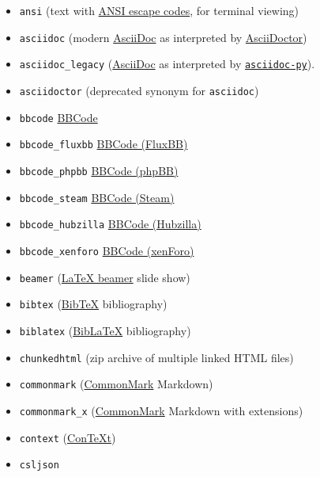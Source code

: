 \documentclass[
]{article}
\providecommand{\tightlist}{%
  \setlength{\itemsep}{0pt}\setlength{\parskip}{0pt}}
\begin{document}
\begin{description}
\hypertarget{output-formats}{}
\begin{itemize}
\tightlist
\item
  \texttt{ansi} (text with
  \href{https://en.wikipedia.org/wiki/ANSI_escape_code}{ANSI escape
  codes}, for terminal viewing)
\item
  \texttt{asciidoc} (modern \href{https://asciidoc.org/}{AsciiDoc} as
  interpreted by \href{https://asciidoctor.org/}{AsciiDoctor})
\item
  \texttt{asciidoc\_legacy} (\href{https://asciidoc.org/}{AsciiDoc} as
  interpreted by
  \href{https://github.com/asciidoc-py/asciidoc-py}{\texttt{asciidoc-py}}).
\item
  \texttt{asciidoctor} (deprecated synonym for \texttt{asciidoc})
\item
  \texttt{bbcode} \href{https://www.bbcode.org/reference.php}{BBCode}
\item
  \texttt{bbcode\_fluxbb}
  \href{https://web.archive.org/web/20210623155046/https://fluxbb.org/forums/help.php\#bbcode}{BBCode
  (FluxBB)}
\item
  \texttt{bbcode\_phpbb}
  \href{https://www.phpbb.com/community/help/bbcode}{BBCode (phpBB)}
\item
  \texttt{bbcode\_steam}
  \href{https://steamcommunity.com/comment/ForumTopic/formattinghelp}{BBCode
  (Steam)}
\item
  \texttt{bbcode\_hubzilla}
  \href{https://hubzilla.org/help/member/bbcode}{BBCode (Hubzilla)}
\item
  \texttt{bbcode\_xenforo}
  \href{https://www.xenfocus.com/community/help/bb-codes/}{BBCode
  (xenForo)}
\item
  \texttt{beamer} (\href{https://ctan.org/pkg/beamer}{LaTeX beamer}
  slide show)
\item
  \texttt{bibtex} (\href{https://ctan.org/pkg/bibtex}{BibTeX}
  bibliography)
\item
  \texttt{biblatex} (\href{https://ctan.org/pkg/biblatex}{BibLaTeX}
  bibliography)
\item
  \texttt{chunkedhtml} (zip archive of multiple linked HTML files)
\item
  \texttt{commonmark} (\href{https://commonmark.org}{CommonMark}
  Markdown)
\item
  \texttt{commonmark\_x} (\href{https://commonmark.org}{CommonMark}
  Markdown with extensions)
\item
  \texttt{context} (\href{https://www.contextgarden.net/}{ConTeXt})
\item
  \texttt{csljson}

\end{itemize}
\end{description}
\end{document}

